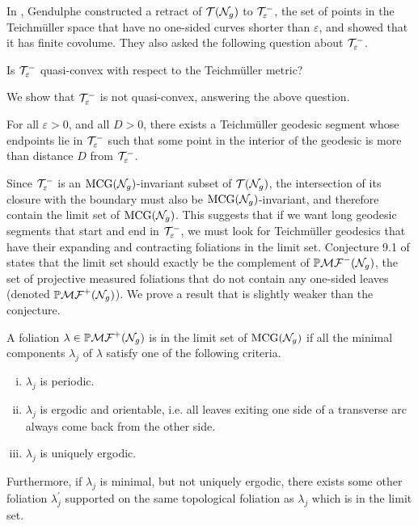 In \cite{gendulphe2017whats}, Gendulphe constructed a retract of $\mathcal{T}(\mathcal{N}_g)$ to $\mathcal{T}_{\varepsilon}^{-}$, the set of points in the Teichm\"uller space that have no one-sided curves shorter than $\varepsilon$, and showed that it has finite covolume.
They also asked the following question about $\mathcal{T}_{\varepsilon}^{-}$.
\begin{unquestion}
  Is $\mathcal{T}_{\varepsilon}^{-}$ quasi-convex with respect to the Teichmüller metric?
\end{unquestion}
We show that ${\mathcal{T}_{\varepsilon}^{-}}$ is not quasi-convex, answering the above question.
\begingroup
\def\thetheorem{\ref{thm:qc-fail}}
\begin{theorem}
  For all $\varepsilon > 0$, and all $D > 0$, there exists a Teichm\"uller geodesic segment whose endpoints lie in ${\mathcal{T}_{\varepsilon}^{-}}$ such that some point in the interior of the geodesic is more than distance $D$ from $\mathcal{T}_{\varepsilon}^{-}$.
\end{theorem}
\addtocounter{theorem}{-1}
\endgroup

Since $\mathcal{T}_{\varepsilon}^{-}$ is an $\mathrm{MCG}(\mathcal{N}_g)$-invariant subset of $\mathcal{T}(\mathcal{N}_g)$, the intersection of its closure with the boundary must also be $\mathrm{MCG}(\mathcal{N}_g)$-invariant, and therefore contain the limit set of $\mathrm{MCG}(\mathcal{N}_g)$.
This suggests that if we want long geodesic segments that start and end in $\mathcal{T}_{\varepsilon}^{-}$, we must look for Teichmüller geodesics that have their expanding and contracting foliations in the limit set.
Conjecture 9.1 of \cite{gendulphe2017whats} states that the limit set should exactly be the complement of $\mathbb{P}\mathcal{MF}^-(\mathcal{N}_g)$, the set of projective measured foliations that do not contain any one-sided leaves (denoted $\mathbb{P}\mathcal{MF}^+(\mathcal{N}_g)$).
We prove a result that is slightly weaker than the conjecture.
\begingroup
\def\thetheorem{\ref{thm:rational-approximation}}
\begin{theorem}
  A foliation $\lambda \in \mathbb{P}\mathcal{MF}^+(\mathcal{N}_g)$ is in the limit set of $\mathrm{MCG}(\mathcal{N}_g)$ if all the minimal components $\lambda_j$ of $\lambda$ satisfy one of the following criteria.
  \begin{enumerate}[(i)]
  \item $\lambda_j$ is periodic.
  \item $\lambda_j$ is ergodic and orientable, i.e. all leaves exiting one side of a transverse arc always come back from the other side.
  \item $\lambda_j$ is uniquely ergodic.
  \end{enumerate}
  Furthermore, if $\lambda_j$ is minimal, but not uniquely ergodic, there exists some other foliation $\lambda_j^{\prime}$ supported on the same topological foliation as $\lambda_j$ which is in the limit set.
\end{theorem}
\addtocounter{theorem}{-1}
\endgroup

